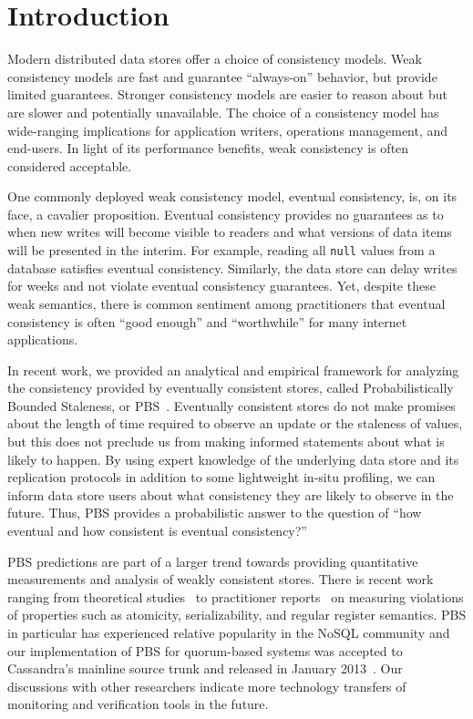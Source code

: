 \section{Introduction}

Modern distributed data stores offer a choice of consistency
models. Weak consistency models are fast and guarantee ``always-on''
behavior, but provide limited guarantees. Stronger consistency models
are easier to reason about but are slower and potentially
unavailable. The choice of a consistency model has wide-ranging implications
for application writers, operations management, and
end-users.  In light of its performance benefits, weak
consistency is often considered acceptable.

One commonly deployed weak consistency model, eventual
consistency, is, on its face, a cavalier proposition. Eventual
consistency provides no guarantees as to when new writes will become
visible to readers and what versions of data items will be presented
in the interim. For example, reading all \texttt{null} values from a
database satisfies eventual consistency. Similarly, the data store can
delay writes for weeks and not violate eventual
consistency guarantees. Yet, despite these weak semantics, there is
common sentiment among practitioners that eventual consistency is
often ``good enough'' and ``worthwhile'' for many
internet applications.

In recent work, we provided an analytical and empirical framework for
analyzing the consistency provided by eventually consistent stores,
called Probabilistically Bounded Staleness, or
PBS~\cite{pbs-vldb2012}. Eventually consistent stores do not make promises
about the length of time required to observe an update or
the staleness of values, but this does not preclude us from making
informed statements about what is likely to happen. By using expert
knowledge of the underlying data store and its replication protocols
in addition to some lightweight in-situ profiling, we can inform data
store users about what consistency they are likely to observe in the
future. Thus, PBS provides a probabilistic answer to the question 
of ``how eventual and how consistent is eventual consistency?''

PBS predictions are part of a larger trend towards providing
quantitative measurements and analysis of weakly consistent
stores. There is recent work ranging from theoretical studies~\cite{podc-hpl}
to practitioner reports~\cite{hotdep} on measuring violations of
properties such as atomicity, serializability, and regular register
semantics. PBS in particular has experienced relative
popularity in the NoSQL community and our implementation of PBS for
quorum-based systems was accepted to Cassandra's mainline
source trunk and released in January 2013~\cite{cassandra-pbs-patch}. 
Our discussions with other researchers indicate more technology transfers 
of monitoring and verification tools in the future.

